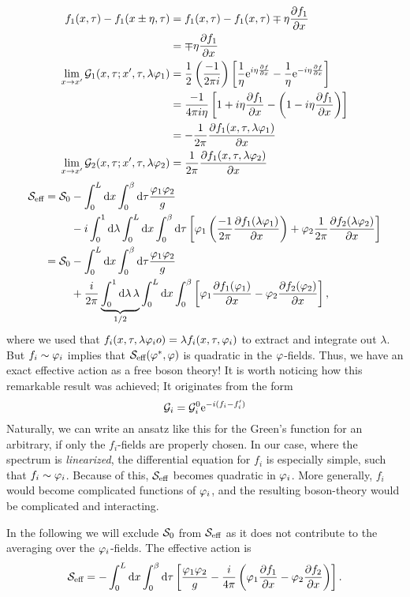 \begin{align*}
f_1(x,\tau) - f_1(x\pm\eta,\tau) &= f_1(x,\tau) - f_1(x,\tau) \mp\eta\pdv{f_1}{x} \\
&= \mp\eta\pdv{f_1}{x} \\
\lim\limits_{x\rightarrow x'}\mathcal{G}_1(x,\tau;x',\tau,\lambda\varphi_1) &= \frac{1}{2}\left(\frac{-1}{2\pi i}\right)\left[\frac{1}{\eta}\mathrm{e}^{i\eta\pdv{f}{x}} - \frac{1}{\eta}\mathrm{e}^{-i\eta\pdv{f}{x}}\right] \\
&= \frac{-1}{4\pi i\eta}\left[1+i\eta\pdv{f_1}{x} - \left(1-i\eta\pdv{f_1}{x}\right)\right] \\
&= -\frac{1}{2\pi}\pdv{f_1(x,\tau,\lambda\varphi_1)}{x} \\
\lim\limits_{x\rightarrow x'}\mathcal{G}_2(x,\tau;x',\tau,\lambda\varphi_2) &= \frac{1}{2\pi}\pdv{f_1(x,\tau,\lambda\varphi_2)}{x}
\end{align*}
\begin{align*}
\Sa_{\text{eff}} = \Sa_0 &- \int_0^L\dx\int_0^\beta\dd\tau\frac{\p_1\p_2}{g}\\&-i\int_0^1\dd\lambda\int_0^L\dx\int_0^\beta\dd\tau\left[\p_1\left(\frac{-1}{2\pi}\pdv{f_1(\lambda\p_1)}{x}\right) + \p_2\frac{1}{2\pi}\pdv{f_2(\lambda\p_2)}{x}\right] \\
=\Sa_0 &- \int_0^L\dx\int_0^\beta\dd\tau\frac{\p_1\p_2}{g}\\
&+\frac{i}{2\pi}\underbrace{\int_0^1\dd\lambda\,\lambda}_{\flatfrac{1}2}\int_0^L\dx\int_0^\beta\left[\p_1\pdv{f_1(\p_1)}{x} -\p_2\pdv{f_2(\p_2)}{x}\right],
\end{align*}
where we used that \(f_i(x, \tau, \lambda\varphi_io) = \lambda f_i(x, \tau, \varphi_i)\) to extract and integrate out $\lambda$.
But \(f_i\sim\varphi_i\) implies that \( \mathcal{S}_{\text{eff}}(\varphi^*,\varphi)\) is quadratic in the $\varphi$-fields. Thus, we have an exact effective action as a free boson theory!
It is worth noticing how this remarkable result was achieved; It originates from the form \[\mathcal{G}_i=\mathcal{G}_i^0\mathrm{e}^{-i(f_i-f_i')}\]
Naturally, we can write an ansatz like this for the Green's function for an arbitrary, if only the $f_i$-fields are properly chosen. In our case, where the spectrum is \textit{linearized}, the differential equation for $f_i$ is especially simple, such that $f_i \sim\varphi_i$. Because of this, $\mathcal{S}_{\text{eff}}$ becomes quadratic in $\varphi_i$. More generally, $f_i$ would become complicated functions of $\varphi_i$, and the resulting boson-theory would be complicated and interacting. 

\label{sect:1}
In the following we will exclude \(\mathcal{S}_{0}\) from \(\mathcal{S}_{\text{eff}}\) as it does not contribute to the averaging over the $\varphi_i$-fields. The effective action is
\begin{equation}
\label{eq:1d_effective_action}
\mathcal{S}_{\text{eff}} = -\int_0^L\dd{x}\int_0^\beta\dd{\tau}\left[\frac{\varphi_1\varphi_2}{g} - \frac{i}{4\pi}\left(\varphi_1\pdv{f_1}{x}-\varphi_2\pdv{f_2}{x}\right)\right].
\end{equation}

